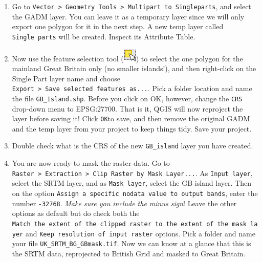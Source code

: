 \documentclass[
  letterpaper,
  DIV=11,
  numbers=noendperiod]{scrreprt}
\begin{document}
\begin{enumerate}
\def\labelenumi{(\arabic{enumi})}
\setcounter{enumi}{126}
\item
  Go to
  \texttt{Vector\ \textgreater{}\ Geometry\ Tools\ \textgreater{}\ Multipart\ to\ Singleparts},
  and select the GADM layer. You can leave it as a temporary layer since
  we will only export one polygon for it in the next step. A new temp
  layer called \texttt{Single\ parts} will be created. Inspect its
  Attribute Table.
\item
  Now use the feature selection tool
  (\includegraphics{index_files/mediabag/mActionSelectRectang.png}) to
  select the one polygon for the mainland Great Britain only (no smaller
  islands!), and then right-click on the Single Part layer name and
  choose
  \texttt{Export\ \textgreater{}\ Save\ selected\ features\ as...}. Pick
  a folder location and name the file \texttt{GB\_Island.shp}. Before
  you click on OK, however, change the \texttt{CRS} drop-down menu to
  EPSG:27700. That is it, QGIS will now reproject the layer before
  saving it! Click \texttt{OK}to save, and then remove the original GADM
  and the temp layer from your project to keep things tidy. Save your
  project.
\item
  Double check what is the CRS of the new \texttt{GB\_island} layer you
  have created.
\item
  You are now ready to mask the raster data. Go to
  \texttt{Raster\ \textgreater{}\ Extraction\ \textgreater{}\ Clip\ Raster\ by\ Mask\ Layer...}.
  As \texttt{Input\ layer}, select the SRTM layer, and as
  \texttt{Mask\ layer}, select the GB island layer. Then on the option
  \texttt{Assign\ a\ specific\ nodata\ value\ to\ output\ bands}, enter
  the number \texttt{-32768}. \emph{Make sure you include the minus
  sign}! Leave the other options as default but do check both the
  \texttt{Match\ the\ extent\ of\ the\ clipped\ raster\ to\ the\ extent\ of\ the\ mask\ layer}
  and \texttt{Keep\ resolution\ of\ input\ raster} options. Pick a
  folder and name your file \texttt{UK\_SRTM\_BG\_GBmask.tif}. Now we
  can know at a glance that this is the SRTM data, reprojected to
  British Grid and masked to Great Britain.
\end{enumerate}
\end{document}
